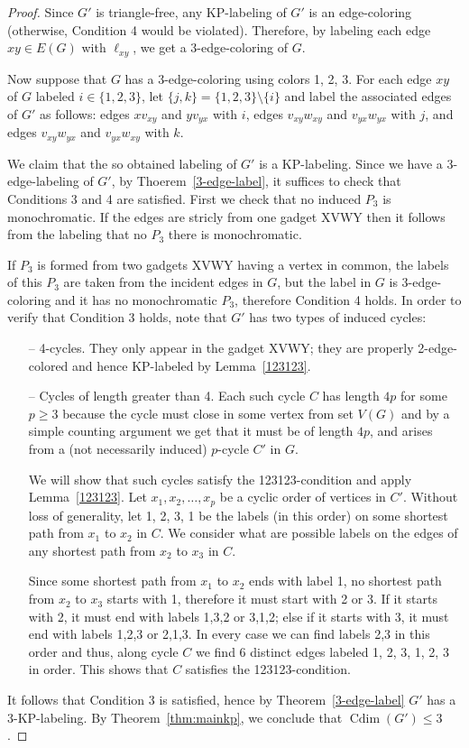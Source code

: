 \documentclass[12pt,a4paper,titlepage,openany]{report}
\DeclareMathOperator{\Cdim}{Cdim}
\begin{document}
\begin{proof}
 Since $G'$ is triangle-free, any KP-labeling of $G'$ is an edge-coloring (otherwise, Condition 4 would be violated). Therefore, by labeling each edge $xy \in E(G)$ with $\ell_{xy}$, we get a 3-edge-coloring of $G$.

 Now suppose that $G$ has a 3-edge-coloring using colors 1, 2, 3. For each edge $xy$ of $G$ labeled $i \in \{1, 2, 3\}$, let $\{j, k\} = \{1, 2, 3\} \setminus  \{i\}$ and label the associated edges of $G'$ as follows: edges $xv_{xy}$ and $yv_{yx}$ with $i$, edges $v_{xy} w_{xy}$ and $v_{yx} w_{yx}$ with $j$, and edges $v_{xy} w_{yx}$ and $v_{yx} w_{xy}$ with $k$.

 We claim that the so obtained labeling of $G'$ is a KP-labeling. Since we have a 3-edge-labeling of $G'$, by Thoerem~\ref{3-edge-label}, it suffices to check that Conditions 3 and 4 are satisfied. First we check that no induced $P_3$ is monochromatic. If the edges are stricly from one gadget XVWY then it follows from the labeling that no $P_3$ there is monochromatic.

 If $P_3$ is formed from two gadgets XVWY having a vertex in common, the labels of this $P_3$ are taken from the incident edges in $G$, but the label in $G$ is 3-edge-coloring and it has no monochromatic $P_3$, therefore Condition 4 holds.
In order to verify that Condition 3 holds, note that $G'$ has two types of induced cycles:
\begin{enumerate}
\item[--] 4-cycles. They only appear in the gadget XVWY; they are properly 2-edge-colored and hence KP-labeled by Lemma~\ref{123123}.
\item[--] Cycles of length greater than 4. Each such cycle $C$ has length $4p$ for some $p \geq 3$ because the cycle must close in some vertex from set $V(G)$ and by a simple counting argument we get that it must be of length $4p$, and arises from a (not necessarily induced) $p$-cycle $C'$ in $G$.

We will show that such cycles satisfy the 123123-condition and apply Lemma~\ref{123123}. Let $x_1, x_2,\ldots, x_p$ be a cyclic order of vertices in $C'$. Without loss of generality, let 1, 2, 3, 1 be the labels (in this order) on some shortest path from $x_1$ to $x_2$ in $C$. We consider what are possible labels on the edges of any shortest path from $x_2$ to $x_3$ in $C$.

Since some shortest path from $x_1$ to $x_2$ ends with label 1, no shortest path from $x_2$ to $x_3$ starts with 1, therefore it must start with 2 or 3. If it starts with 2, it must end with labels 1,3,2 or 3,1,2; else if it starts with 3, it must end with labels 1,2,3 or 2,1,3. In every case we can find labels 2,3 in this order and thus, along cycle $C$ we find 6 distinct edges labeled 1, 2, 3, 1, 2, 3 in order. This shows that $C$ satisfies the 123123-condition.
\end{enumerate}
It follows that Condition 3 is satisfied, hence by Theorem~\ref{3-edge-label} $G'$ has a 3-KP-labeling. By Theorem~\ref{thm:mainkp}, we conclude that $\Cdim(G') \leq 3$.
\end{proof}
\end{document}
